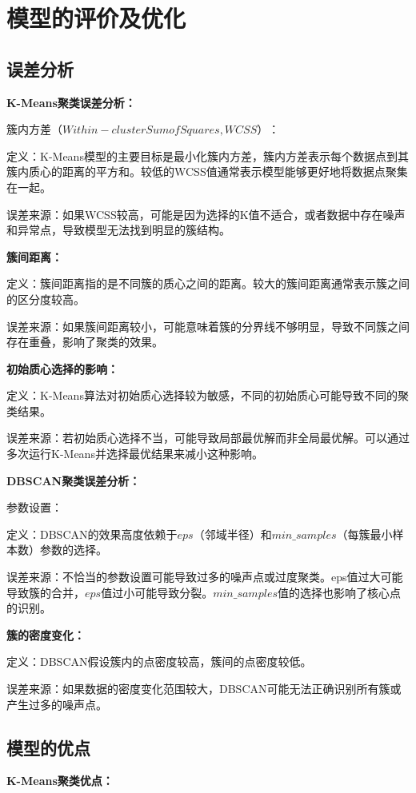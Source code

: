 \documentclass[a4paper]{article}
\begin{document}
\section{模型的评价及优化}
\subsection{误差分析}

\textbf{K-Means聚类误差分析：}

\textbf{$簇内方差（Within-cluster Sum of Squares, WCSS）：$}

定义：K-Means模型的主要目标是最小化簇内方差，簇内方差表示每个数据点到其簇内质心的距离的平方和。较低的WCSS值通常表示模型能够更好地将数据点聚集在一起。

误差来源：如果WCSS较高，可能是因为选择的K值不适合，或者数据中存在噪声和异常点，导致模型无法找到明显的簇结构。

\textbf{簇间距离：}

定义：簇间距离指的是不同簇的质心之间的距离。较大的簇间距离通常表示簇之间的区分度较高。

误差来源：如果簇间距离较小，可能意味着簇的分界线不够明显，导致不同簇之间存在重叠，影响了聚类的效果。

\textbf{初始质心选择的影响：}

定义：K-Means算法对初始质心选择较为敏感，不同的初始质心可能导致不同的聚类结果。

误差来源：若初始质心选择不当，可能导致局部最优解而非全局最优解。可以通过多次运行K-Means并选择最优结果来减小这种影响。

\textbf{DBSCAN聚类误差分析：}

参数设置：

定义：DBSCAN的效果高度依赖于$eps$（邻域半径）和$min\_samples$（每簇最小样本数）参数的选择。

误差来源：不恰当的参数设置可能导致过多的噪声点或过度聚类。eps值过大可能导致簇的合并，$eps$值过小可能导致分裂。$min\_samples$值的选择也影响了核心点的识别。

\textbf{簇的密度变化：}

定义：DBSCAN假设簇内的点密度较高，簇间的点密度较低。

误差来源：如果数据的密度变化范围较大，DBSCAN可能无法正确识别所有簇或产生过多的噪声点。

\subsection{模型的优点}

\textbf{K-Means聚类优点：}
\end{document}
